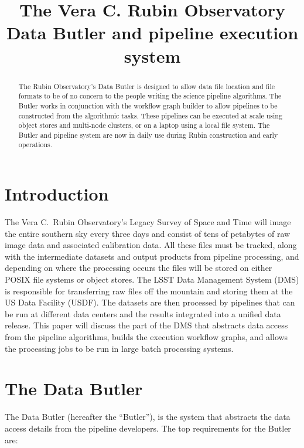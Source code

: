 \documentclass[]{spie}
\title{The Vera C. Rubin Observatory Data Butler and pipeline execution system}
\begin{document}
\maketitle

\begin{abstract}
    The Rubin Observatory's Data Butler is designed to allow data file location and file formats to be of no concern to the people writing the science pipeline algorithms.
    The Butler works in conjunction with the workflow graph builder to allow pipelines to be constructed from the algorithmic tasks.
    These pipelines can be executed at scale using object stores and multi-node clusters, or on a laptop using a local file system.
    The Butler and pipeline system are now in daily use during Rubin construction and early operations.
\end{abstract}


\section{Introduction}

The Vera C.\ Rubin Observatory's Legacy Survey of Space and Time \cite{2019ApJ...873..111I} will image the entire southern sky every three days and consist of tens of petabytes of raw image data and associated calibration data.
All these files must be tracked, along with the intermediate datasets and output products from pipeline processing, and depending on where the processing occurs the files will be stored on either POSIX file systems or object stores.
The LSST Data Management System (DMS)\cite{2017ASPC..512..279J} is responsible for transferring raw files off the mountain and storing them at the US Data Facility (USDF).
The datasets are then processed by pipelines that can be run at different data centers and the results integrated into a unified data release.
This paper will discuss the part of the DMS that abstracts data access from the pipeline algorithms, builds the execution workflow graphs, and allows the processing jobs to be run in large batch processing systems.

\section{The Data Butler}

The Data Butler (hereafter the ``Butler''), is the system that abstracts the data access details from the pipeline developers.
The top requirements for the Butler are:
\end{document}
